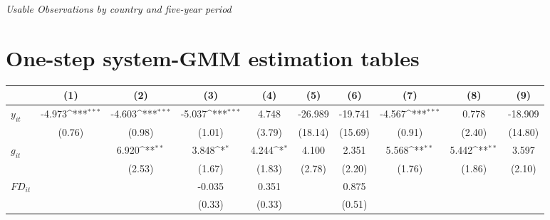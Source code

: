 \documentclass[12pt, a4paper]{article}
\begin{document}
\begin{appendices}
\begin{longtabu*}
\caption[Usable Observations by Country and Five-Year Period]{\textit{Usable Observations by country and five-year period}}
	\label{ObsByCountry}%
\end{longtabu*}%

\section{One-step system-GMM estimation tables} \label{1GMMTables}

	\begin{table}[htbp]
	\centering
	\scriptsize
	\setlength\tabcolsep{1pt}	
	\begin{threeparttable}
		{
			\def\sym#1{\ifmmode^{#1}\else\(^{#1}\)\fi}
			\begin{tabular}{l*{9}{c}}
				\hline\hline
				&\multicolumn{1}{c}{(1)}&\multicolumn{1}{c}{(2)}&\multicolumn{1}{c}{(3)}&\multicolumn{1}{c}{(4)}&\multicolumn{1}{c}{(5)}&\multicolumn{1}{c}{(6)}&\multicolumn{1}{c}{(7)}&\multicolumn{1}{c}{(8)}&\multicolumn{1}{c}{(9)}\\
				\hline
				$y_{it}$               &      -4.973\sym{***}&      -4.603\sym{***}&      -5.037\sym{***}&       4.748         &     -26.989         &     -19.741         &      -4.567\sym{***}&       0.778         &     -18.909         \\
				&      (0.76)         &      (0.98)         &      (1.01)         &      (3.79)         &     (18.14)         &     (15.69)         &      (0.91)         &      (2.40)         &     (14.80)         \\
				$g_{it}$              &                     &       6.920\sym{**} &       3.848\sym{*}  &       4.244\sym{*}  &       4.100         &       2.351         &       5.568\sym{**} &       5.442\sym{**} &       3.597         \\
				&                     &      (2.53)         &      (1.67)         &      (1.83)         &      (2.78)         &      (2.20)         &      (1.76)         &      (1.86)         &      (2.10)         \\
				$FD_{it}$                &                     &                     &      -0.035         &       0.351         &                     &       0.875         &                     &                     &                     \\
				&                     &                     &      (0.33)         &      (0.33)         &                     &      (0.51)         &                     &                     &                     \\

\end{tabular}}
\end{threeparttable}
\end{table}
\end{appendices}
\end{document}
